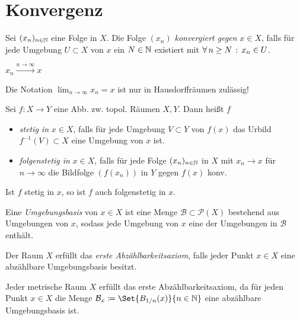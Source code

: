 \documentclass{cheat-sheet}
\newcommand{\Pow}{\mathcal{P}} %
\begin{document}
\section{Konvergenz}

\begin{defn}
  Sei $(x_n)_{n \in \mathbb{N}}$ eine Folge in $X$. Die Folge $(x_n)$ \emph{konvergiert gegen} $x \in X$, falls für jede Umgebung $U \subset X$ von $x$ ein $N \in \mathbb{N}$ existiert mit $\forall \, {n \geq N} \,:\, x_n \in U$.
\end{defn}

\begin{nota}
  $x_n \xrightarrow{n \to \infty} x$
\end{nota}

\begin{bem}
  Die Notation $\!\lim_{n \to \infty} \! x_n = x$ ist nur in Hausdorffräumen zulässig!
\end{bem}

\begin{defn}
  Sei $f : X {\to} Y$ eine Abb. zw. topol. Räumen $X, Y$. Dann heißt $f$
  \begin{itemize}
    \item \emph{stetig in} $x \in X$, falls für jede Umgebung $V \subset Y$ von $f(x)$ das Urbild $f^{-1}(V) \subset X$ eine Umgebung von $x$ ist.
    \item \emph{folgenstetig in} $x \in X$, falls für jede Folge $(x_n)_{n \in \mathbb{N}}$ in $X$ mit $x_n \to x$ für $n \to \infty$ die Bildfolge $(f(x_n))$ in $Y$ gegen $f(x)$ konv.
  \end{itemize}
\end{defn}

\begin{prop}
  Ist $f$ stetig in $x$, so ist $f$ auch folgenstetig in $x$.
\end{prop}

\begin{defn}
  Eine \emph{Umgebungsbasis} von $x \in X$ ist eine Menge $\mathcal{B} \subset \Pow(X)$ bestehend aus Umgebungen von $x$, sodass jede Umgebung von $x$ eine der Umgebungen in $\mathcal{B}$ enthält.
\end{defn}

\begin{defn}
  Der Raum $X$ erfüllt das \emph{erste Abzählbarkeitsaxiom}, falls jeder Punkt $x \in X$ eine abzählbare Umgebungsbasis besitzt.
\end{defn}

\begin{bem}
  Jeder metrische Raum $X$ erfüllt das erste Abzählbarkeitsaxiom, da für jeden Punkt $x \in X$ die Menge $\mathcal{B}_x \coloneqq \Set{B_{1/n}(x)}{n\in\N}$ eine abzählbare Umgebungsbasis ist.
\end{bem}
\end{document}
